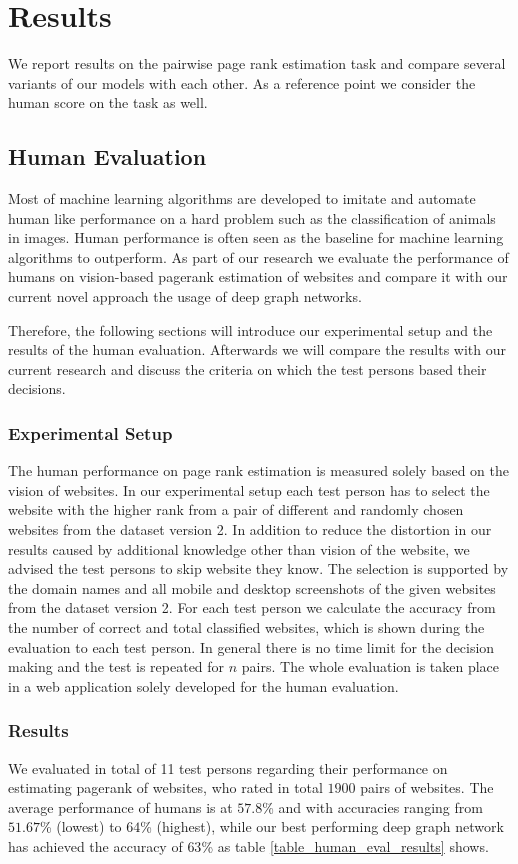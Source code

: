 \section{Results}
We report results on the pairwise page rank estimation task and compare several variants of our models with each other. As a reference point we consider the human score on the task as well.

\subsection{Human Evaluation}
Most of machine learning algorithms are developed to imitate and automate human like performance on a hard problem such as the classification of animals in images. Human performance is often seen as the baseline for machine learning algorithms to outperform. As part of our research we evaluate the performance of humans on vision-based pagerank estimation of websites and compare it with our current novel approach the usage of deep graph networks. 

Therefore, the following sections will introduce our experimental setup and the results of the human evaluation. Afterwards we will compare the results with our current research and discuss the criteria on which the test persons based their decisions.

\subsubsection{Experimental Setup} 
The human performance on page rank estimation is measured solely based on the vision of websites. In our experimental setup each test person has to select the website with the higher rank from a pair of different and randomly chosen websites from the dataset version 2. In addition to reduce the distortion in our results caused by additional knowledge other than vision of the website, we advised the test persons to skip website they know. The selection is supported by the domain names and all mobile and desktop screenshots of the given websites from the dataset version 2. For each test person we calculate the accuracy from the number of correct and total classified websites, which is shown during the evaluation to each test person. In general there is no time limit for the decision making and the test is repeated for $n$ pairs. The whole evaluation is taken place in a web application solely developed for the human evaluation.

\subsubsection{Results}
We evaluated in total of 11 test persons regarding their performance on estimating pagerank of websites, who rated in total $1900$ pairs of websites. The average performance of humans is at $57.8$\% and with accuracies ranging from $51.67$\% (lowest) to $64$\% (highest), while our best performing deep graph network has achieved the accuracy of $63$\% as table \ref{table_human_eval_results} shows.

